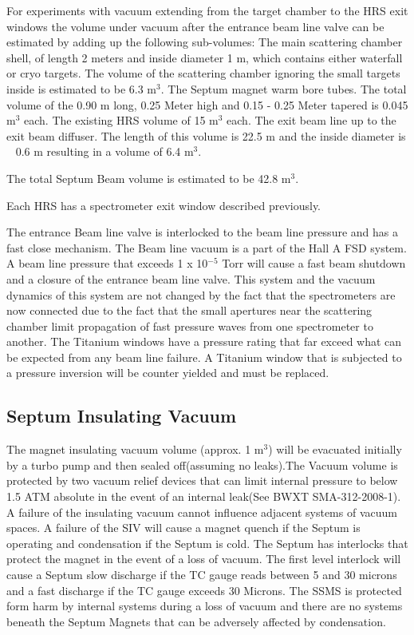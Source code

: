 {For experiments with vacuum extending from the target chamber to the HRS exit windows 
the volume under vacuum after the entrance beam line  valve can be estimated by 
adding up the following sub-volumes:
\noindent The main scattering chamber shell, of length 2 meters and inside diameter 
1 m, which contains either waterfall or cryo targets.  The volume of the scattering 
chamber ignoring the small targets inside is estimated to be 6.3 m$^3$.
\noindent The Septum magnet warm bore tubes.  The total volume of the 0.90 m long, 0.25 Meter 
high and 0.15 - 0.25 Meter tapered is 0.045 m$^3$ each.
\noindent The existing HRS volume of 15 m$^3$ each.
\noindent The exit beam line up to the exit beam diffuser.  The length of this volume is 22.5 m 
and the inside diameter is ~ 0.6 m resulting in a volume of 6.4 m$^3$.

The total Septum Beam volume is estimated to be 42.8 m$^3$.

Each HRS has a spectrometer exit window described previously.

The entrance Beam line valve is interlocked to the beam line pressure and has a fast 
close mechanism. The Beam line vacuum is a part of the Hall A FSD system. A beam line 
pressure that exceeds 1 x 10$^{-5}$ Torr will cause a fast beam shutdown and a closure 
of the entrance beam line valve. This system and the vacuum dynamics of this system 
are not changed by the fact that the spectrometers are now connected due to the fact 
that the small apertures near the scattering chamber limit propagation of fast pressure 
waves from one spectrometer to another. The Titanium windows have a pressure rating that 
far exceed what can be expected from any beam line failure. A Titanium window that is 
subjected to a pressure inversion will be counter yielded and must be replaced.


\subsection {\bf Septum Insulating Vacuum}


The magnet insulating vacuum volume (approx. 1 m$^3$) will be evacuated initially by a 
turbo pump and then sealed off(assuming no leaks).The Vacuum volume is protected by 
two vacuum relief devices that can limit internal pressure to below 1.5 ATM absolute 
in the event of an internal leak(See BWXT SMA-312-2008-1). A failure of the insulating 
vacuum cannot influence adjacent systems of vacuum spaces. A failure of the SIV will 
cause a magnet quench if the Septum is operating and condensation if the Septum is cold. 
The Septum has interlocks that protect the magnet in the event of a loss of vacuum. The 
first level interlock will cause a Septum slow discharge if the TC gauge reads between 
5 and 30 microns and a fast discharge if the TC gauge exceeds 30 Microns. The SSMS is 
protected form harm by internal systems during a loss of vacuum and there are no systems 
beneath the Septum Magnets  that can be adversely affected by condensation.

}
